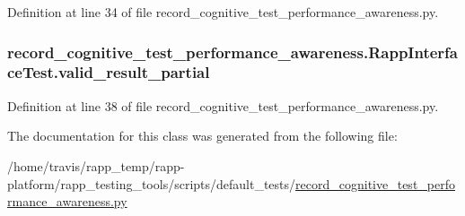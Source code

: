 Definition at line 34 of file record\-\_\-cognitive\-\_\-test\-\_\-performance\-\_\-awareness.\-py.

\hypertarget{classrecord__cognitive__test__performance__awareness_1_1RappInterfaceTest_a7284c8bf436622537d94a4ba146be1fe}{
\subsubsection[{valid\-\_\-result\-\_\-partial}]{\setlength{\rightskip}{0pt plus 5cm}record\-\_\-cognitive\-\_\-test\-\_\-performance\-\_\-awareness.\-Rapp\-Interface\-Test.\-valid\-\_\-result\-\_\-partial}}\label{classrecord__cognitive__test__performance__awareness_1_1RappInterfaceTest_a7284c8bf436622537d94a4ba146be1fe}


Definition at line 38 of file record\-\_\-cognitive\-\_\-test\-\_\-performance\-\_\-awareness.\-py.



The documentation for this class was generated from the following file\-:\begin{DoxyCompactItemize}
\item 
/home/travis/rapp\-\_\-temp/rapp-\/platform/rapp\-\_\-testing\-\_\-tools/scripts/default\-\_\-tests/\hyperlink{record__cognitive__test__performance__awareness_8py}{record\-\_\-cognitive\-\_\-test\-\_\-performance\-\_\-awareness.\-py}\end{DoxyCompactItemize}
